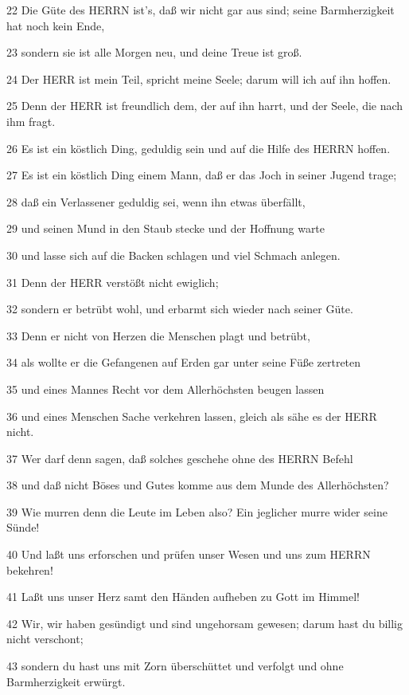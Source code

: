 \par 22 Die Güte des HERRN ist's, daß wir nicht gar aus sind; seine Barmherzigkeit hat noch kein Ende,
\par 23 sondern sie ist alle Morgen neu, und deine Treue ist groß.
\par 24 Der HERR ist mein Teil, spricht meine Seele; darum will ich auf ihn hoffen.
\par 25 Denn der HERR ist freundlich dem, der auf ihn harrt, und der Seele, die nach ihm fragt.
\par 26 Es ist ein köstlich Ding, geduldig sein und auf die Hilfe des HERRN hoffen.
\par 27 Es ist ein köstlich Ding einem Mann, daß er das Joch in seiner Jugend trage;
\par 28 daß ein Verlassener geduldig sei, wenn ihn etwas überfällt,
\par 29 und seinen Mund in den Staub stecke und der Hoffnung warte
\par 30 und lasse sich auf die Backen schlagen und viel Schmach anlegen.
\par 31 Denn der HERR verstößt nicht ewiglich;
\par 32 sondern er betrübt wohl, und erbarmt sich wieder nach seiner Güte.
\par 33 Denn er nicht von Herzen die Menschen plagt und betrübt,
\par 34 als wollte er die Gefangenen auf Erden gar unter seine Füße zertreten
\par 35 und eines Mannes Recht vor dem Allerhöchsten beugen lassen
\par 36 und eines Menschen Sache verkehren lassen, gleich als sähe es der HERR nicht.
\par 37 Wer darf denn sagen, daß solches geschehe ohne des HERRN Befehl
\par 38 und daß nicht Böses und Gutes komme aus dem Munde des Allerhöchsten?
\par 39 Wie murren denn die Leute im Leben also? Ein jeglicher murre wider seine Sünde!
\par 40 Und laßt uns erforschen und prüfen unser Wesen und uns zum HERRN bekehren!
\par 41 Laßt uns unser Herz samt den Händen aufheben zu Gott im Himmel!
\par 42 Wir, wir haben gesündigt und sind ungehorsam gewesen; darum hast du billig nicht verschont;
\par 43 sondern du hast uns mit Zorn überschüttet und verfolgt und ohne Barmherzigkeit erwürgt.
